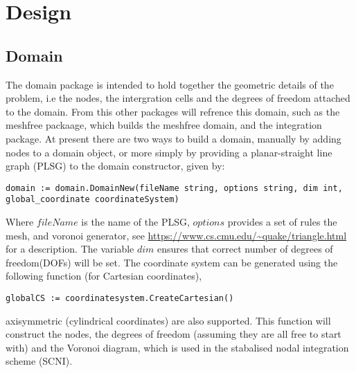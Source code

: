 \chapter{Design}
\section{Domain}
The domain package is intended to hold together the geometric details of the problem, i.e the nodes, the intergration cells and the degrees of freedom attached to the domain. From this other packages will refrence this domain, such as the meshfree packaage, which builds the meshfree domain, and the integration package. At present there are two ways to build a domain, manually by adding nodes to a domain object, or more simply by providing a planar-straight line graph (PLSG) to the domain constructor, given by:
\begin{lstlisting}
domain := domain.DomainNew(fileName string, options string, dim int, global_coordinate coordinateSystem)
\end{lstlisting}
Where $fileName$ is the name of the PLSG, $options$ provides a set of rules the mesh, and voronoi generator, see \url{https://www.cs.cmu.edu/~quake/triangle.html} for a description. The variable $dim$ ensures that correct number of degrees of freedom(DOFs) will be set. The coordinate system can be generated using the following function (for Cartesian coordinates),
\begin{lstlisting}
globalCS := coordinatesystem.CreateCartesian()
\end{lstlisting}
axisymmetric (cylindrical coordinates) are also supported. This function will construct the nodes, the degrees of freedom (assuming they are all free to start with) and the Voronoi diagram, which is used in the stabalised nodal integration scheme (SCNI).